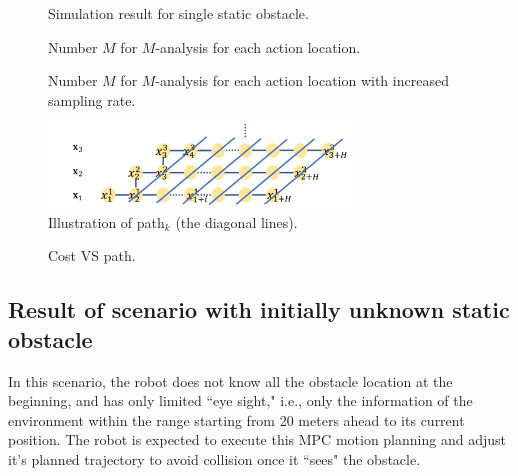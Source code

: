 \documentclass[letterpaper, 10 pt, conference]{ieeeconf}  %
\begin{document}
\begin{figure}[t]
\begin{center}

\caption{Simulation result for single static obstacle.  }
\label{fig:1_1}
\end{center}
\end{figure}


\begin{figure}[t]
\begin{center}

\caption{ Number $M$ for $M$-analysis for each action location.}
\label{fig:single_m}
\end{center}
\end{figure}



\begin{figure}[t]
\begin{center}

\caption{Number $M$ for $M$-analysis for each action location with increased sampling rate.}
\label{fig:single_m_0.1Hz}
\end{center}
\end{figure}



\begin{figure}[t]
\begin{center}
\includegraphics[width=8cm]{src/1_3_path.png}
\caption{Illustration of path$_k$ (the diagonal lines).}
\label{fig:cost1}
\end{center}
\end{figure}

\begin{figure}[t]
\begin{center}

\caption{Cost VS path.}
\label{fig:costplot}
\end{center}
\end{figure}

\subsection{Result of scenario with initially unknown static obstacle}
In this scenario, the robot does not know all the obstacle location at the beginning, and has only limited ``eye sight," i.e., only the information of the environment within the range starting from 20 meters ahead to its current position. The robot is expected to execute this MPC motion planning and adjust it's planned trajectory to avoid collision once it ``sees" the obstacle.
\end{document}
